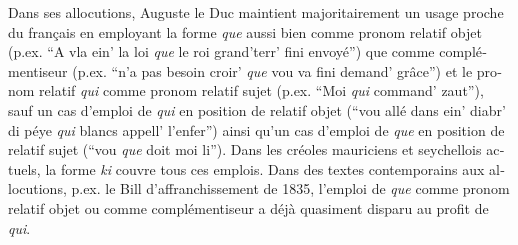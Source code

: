 \documentclass[output=paper]{langscibook}
\begin{document}
\begin{otherlanguage}{french}
Dans ses allocutions, Auguste le Duc maintient majoritairement un usage proche du français en employant la forme \textit{que} aussi bien comme pronom relatif objet (p.ex. “A vla ein’ la loi \textit{que} le roi grand’terr’ fini envoyé”) que comme complémentiseur (p.ex. “n’a pas besoin croir’ \textit{que} vou va fini demand’ grâce”) et le pronom relatif \textit{qui} comme pronom relatif sujet (p.ex. “Moi \textit{qui} command’ zaut”), sauf un cas d’emploi de \textit{qui} en position de relatif objet (“vou allé dans ein’ diabr’ di péye \textit{qui} blancs appell’ l’enfer”) ainsi qu’un cas d’emploi de \textit{que} en position de relatif sujet (“vou \textit{que} doit moi li”). Dans les créoles mauriciens et seychellois actuels, la forme \textit{ki} couvre tous ces emplois. Dans des textes contemporains aux allocutions, p.ex. le Bill d’affranchissement de 1835, l’emploi de \textit{que} comme pronom relatif objet ou comme complémentiseur a déjà quasiment disparu au profit de \textit{qui}. 



\end{otherlanguage}
\end{document}
